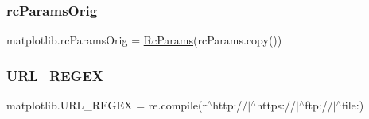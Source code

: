 \subsubsection{\texorpdfstring{rc\+Params\+Orig}{rcParamsOrig}}
{\footnotesize\ttfamily matplotlib.\+rc\+Params\+Orig = \hyperlink{classmatplotlib_1_1RcParams}{Rc\+Params}(rc\+Params.\+copy())}

\mbox{\label{namespacematplotlib_ae573a9e7b46ba9090ad27696d75d0f5b}} 
\subsubsection{\texorpdfstring{U\+R\+L\+\_\+\+R\+E\+G\+EX}{URL\_REGEX}}
{\footnotesize\ttfamily matplotlib.\+U\+R\+L\+\_\+\+R\+E\+G\+EX = re.\+compile(r\textquotesingle{}$^\wedge$http\+://$\vert$$^\wedge$https\+://$\vert$$^\wedge$ftp\+://$\vert$$^\wedge$file\+:\textquotesingle{})}

